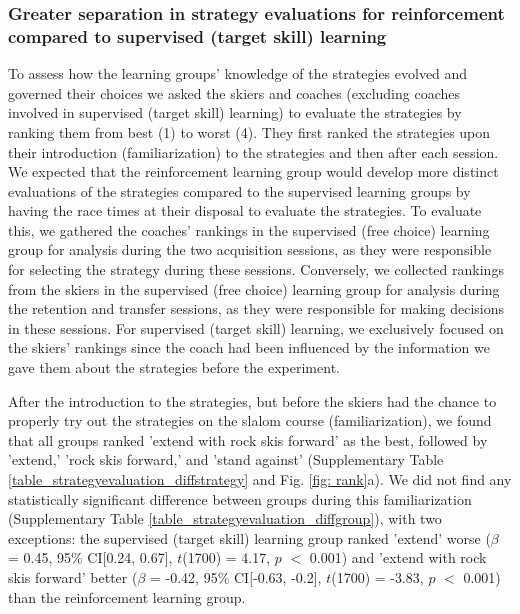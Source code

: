 \documentclass[pdflatex,sn-nature]{sn-jnl}%
\theoremstyle{thmstyleone}%
\theoremstyle{thmstyletwo}%
\theoremstyle{thmstylethree}%
\begin{document}
\subsubsection{Greater separation in strategy evaluations for reinforcement compared to supervised (target skill) learning}\label{result_evaluation_evaluation}
To assess how the learning groups' knowledge of the strategies evolved and governed their choices we asked the skiers and coaches (excluding coaches involved in supervised (target skill) learning) to evaluate the strategies by ranking them from best (1) to worst (4). They first ranked the strategies upon their introduction (familiarization) to the strategies and then after each session. We expected that the reinforcement learning group would develop more distinct evaluations of the strategies compared to the supervised learning groups by having the race times at their disposal to evaluate the strategies. To evaluate this, we gathered the coaches' rankings in the supervised (free choice) learning group for analysis during the two acquisition sessions, as they were responsible for selecting the strategy during these sessions. Conversely, we collected rankings from the skiers in the supervised (free choice) learning group for analysis during the retention and transfer sessions, as they were responsible for making decisions in these sessions. For supervised (target skill) learning, we exclusively focused on the skiers' rankings since the coach had been influenced by the information we gave them about the strategies before the experiment. 

After the introduction to the strategies, but before the skiers had the chance to properly try out the strategies on the slalom course (familiarization), we found that all groups ranked 'extend with rock skis forward' as the best, followed by 'extend,' 'rock skis forward,' and 'stand against' (Supplementary Table \ref{table_strategyevaluation_diffstrategy} and Fig. \ref{fig: rank}a). We did not find any statistically significant difference between groups during this familiarization (Supplementary Table \ref{table_strategyevaluation_diffgroup}), with two exceptions: the supervised (target skill) learning group ranked 'extend' worse ($\beta$ = 0.45, 95\% CI[0.24,  0.67], $t$(1700) = 4.17, $p$ $<$ 0.001) and 'extend with rock skis forward' better  ($\beta$ = -0.42, 95\% CI[-0.63, -0.2], $t$(1700) = -3.83, $p$ $<$ 0.001) than the reinforcement learning group.
\end{document}
